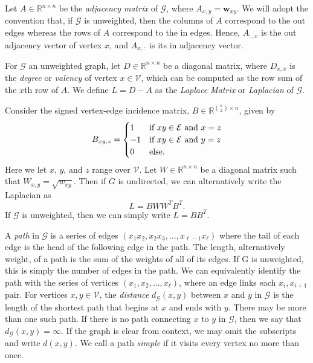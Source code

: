 \documentclass[10]{article}
\begin{document}
Let $A \in \mathbb{R}^{n\times n}$ be the \emph{adjacency matrix} of $\mathcal{G}$, where $A_{x,y} = \mathbf{w}_{xy}$.
We will adopt the convention that, if $\mathcal{G}$ is unweighted, then the columns of $A$ correspond to the out edges whereas the rows of $A$ correspond to the in edges. 
Hence, $A_{:,x}$ is the out adjacency vector of vertex $x$, and $A_{x,:}$ is its in adjacency vector.

For $\mathcal{G}$ an unweighted graph, let $D \in \mathbb{R}^{n\times n}$ be a diagonal matrix, where $D_{x,x}$ is the \emph{degree} or \emph{valency} of vertex $x \in \mathcal{V}$, which can be computed as the row sum of the $x$th row of $A$. 
We define $L = D - A$ as the \emph{Laplace Matrix} or \emph{Laplacian} of $\mathcal{G}$.

Consider the signed vertex-edge incidence matrix, $B \in \mathbb{R}^{{n \choose 2} \times n}$, given by
%
\begin{equation} \label{eq:veim}
B_{xy,z} = 
\begin{cases}
1 & \textnormal{if $xy \in \mathcal{E}$ and $x=z$} \\
-1 & \textnormal{if $xy \in \mathcal{E}$ and $y=z$} \\
0 & \textnormal{else}.
\end{cases}
\end{equation}
%
Here we let $x$, $y$, and $z$ range over $\mathcal{V}$. 
Let $W \in \mathbb{R}^{n \times n}$ be a diagonal matrix such that $W_{x,y} = \sqrt{w_{xy}}$.
Then if $G$ is undirected, we can alternatively write the Laplacian as 
%
\begin{equation} \label{eq:laplacian}
L = BWW^TB^T.
\end{equation}
%
If $\mathcal{G}$ is unweighted, then we can simply write $L = BB^T$. 

A \emph{path} in $\mathcal{G}$ is a series of edges $(x_1 x_2, x_2 x_3, \dots, x_{\ell -1} x_\ell)$ where the tail of each edge is the head of the following edge in the path. 
The length, alternatively weight, of a path is the sum of the weights of all of its edges.
If G is unweighted, this is simply the number of edges in the path.
We can equivalently identify the path with the series of vertices $(x_1, x_2, \dots, x_\ell)$, where an edge links each $x_i, x_{i+1}$ pair.
For vertices $x,y \in \mathcal{V}$, the \emph{distance} $d_\mathcal{G}(x,y)$ between $x$ and $y$ in $\mathcal{G}$ is the length of the shortest path that begins at $x$ and ends with $y$. 
There may be more than one such path. 
If there is no path connecting $x$ to $y$ in $\mathcal{G}$, then we say that $d_\mathcal{G}(x,y) = \infty$. 
If the graph is clear from context, we may omit the subscripts and write $d(x,y)$.
We call a path \emph{simple} if it visits every vertex no more than once. 
\end{document}
